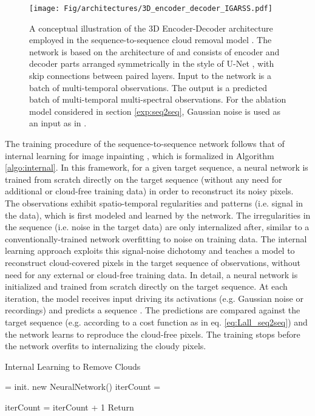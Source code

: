 \documentclass[journal]{IEEEtran}
\begin{document}
\begin{figure*}[h!tb] \texttt{[image: Fig/architectures/3D\_encoder\_decoder\_IGARSS.pdf]}
    \caption{A conceptual illustration of the 3D Encoder-Decoder architecture  employed in the sequence-to-sequence cloud removal model \cite{ebel2021seq2seq}. The network is based on the architecture of \cite{zhang2019internal} and consists of encoder and decoder parts arranged symmetrically in the style of U-Net \cite{ronneberger2015u}, with skip connections between paired layers. Input to the network is a batch of multi-temporal  observations. The output is a predicted batch of multi-temporal multi-spectral  observations. For the ablation model considered in section \ref{exp:seq2seq}, Gaussian noise is used as an input as in \cite{ulyanov2018deep, zhang2019internal}.}
    \label{fig:architecture_seq2seq}
\end{figure*}


The training procedure of the sequence-to-sequence network follows that of internal learning for image inpainting \cite{ulyanov2018deep, zhang2019internal}, which is formalized in Algorithm \ref{algo:internal}. In this framework, for a given target sequence, a neural network is trained from scratch directly on the target sequence (without any need for additional or cloud-free training data) in order to reconstruct its noisy pixels. The observations exhibit spatio-temporal regularities and patterns (i.e. signal in the data), which is first modeled and learned by the network. The irregularities in the sequence (i.e. noise in the target data) are only internalized after, similar to a conventionally-trained network overfitting to noise on training data. The internal learning approach exploits this signal-noise dichotomy and teaches a model to reconstruct cloud-covered pixels in the target sequence of  observations, without need for any external or cloud-free training data. In detail, a neural network is initialized and trained from scratch directly on the target sequence. At each iteration, the model receives input driving its activations (e.g. Gaussian noise or  recordings) and predicts a sequence . The predictions  are compared against the target sequence  (e.g. according to a cost function  as in eq. \ref{eq:Lall_seq2seq}) and the network learns to reproduce the cloud-free pixels. The training stops before the network overfits to internalizing the cloudy pixels. 

\begin{algorithm}
\caption{Internal Learning to Remove Clouds}
		\begin{algorithmic}[1]
			\State  = init. new NeuralNetwork()
			\State iterCount = 

			\State 
			\State 
            \State iterCount = iterCount + 1
			\EndWhile
			\State Return 
			\EndProcedure
		\end{algorithmic}
	  \label{algo:internal}
	\end{algorithm}
	
\end{document}
